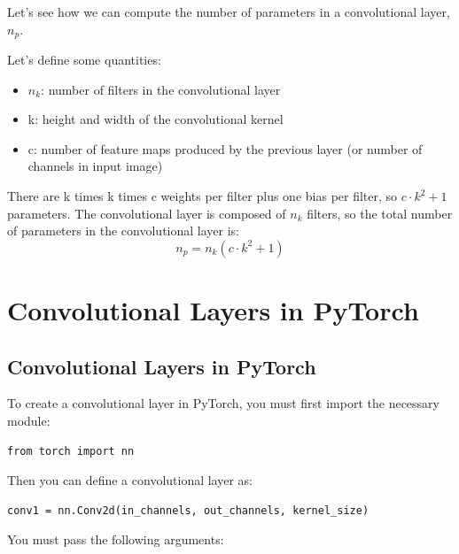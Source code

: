 Let's see how we can compute the number of parameters in a convolutional layer,  \(n_p\). \newline

Let's define some quantities:
\begin{itemize}
    \item \(n_k\): number of filters in the convolutional layer
    \item k: height and width of the convolutional kernel
    \item c: number of feature maps produced by the previous layer (or number of channels in input image)
\end{itemize}

There are k times k times c weights per filter plus one bias per filter, so \(c \cdot k^2 + 1\) parameters. The convolutional layer is composed of \(n_k\) filters, so the total number of parameters in the convolutional layer is:
\[n_p = n_k (c \cdot k^2 + 1)\]


\section{Convolutional Layers in PyTorch}

\subsection{Convolutional Layers in PyTorch}

To create a convolutional layer in PyTorch, you must first import the necessary module:
\begin{lstlisting}
from torch import nn
\end{lstlisting}

Then you can define a convolutional layer as:
\begin{lstlisting}
conv1 = nn.Conv2d(in_channels, out_channels, kernel_size)
\end{lstlisting}
You must pass the following arguments:


